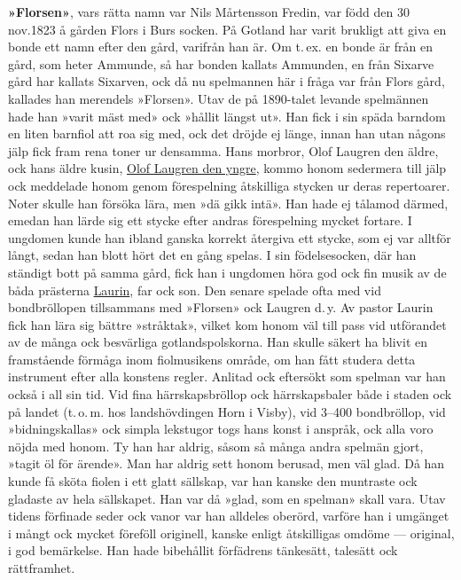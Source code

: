 \textbf{»Florsen»}, vars rätta namn var Nils Mårtensson Fredin, var född den 30 nov.\@ 1823 å gården Flors i Burs socken. På Gotland har varit brukligt att giva en bonde ett namn efter den gård, varifrån han är. Om t.\,ex. en bonde är från en gård, som heter Ammunde, så har bonden kallats Ammunden, en från Sixarve gård har kallats Sixarven, ock då nu spelmannen här i fråga var från Flors gård, kallades han merendels »Florsen». Utav de på 1890-talet levande spelmännen hade han »varit mäst med» ock »hållit längst ut». Han fick i sin späda barndom en liten barnfiol att roa sig med, ock det dröjde ej länge, innan han utan någons jälp fick fram rena toner ur densamma. Hans morbror, Olof Laugren den äldre, ock hans äldre kusin, \href{Laugren}{Olof Laugren den yngre}, kommo honom sedermera till jälp ock meddelade honom genom förespelning åtskilliga stycken ur deras repertoarer. Noter skulle han försöka lära, men »dä gikk intä». Han hade ej tålamod därmed, emedan han lärde sig ett stycke efter andras förespelning mycket fortare. I ungdomen kunde han ibland ganska korrekt återgiva ett stycke, som ej var alltför långt, sedan han blott hört det en gång spelas. I sin födelsesocken, där han ständigt bott på samma gård, fick han i ungdomen höra god ock fin musik av de båda prästerna \href{Laurin}{Laurin}, far ock son. Den senare spelade ofta med vid bondbröllopen tillsammans med »Florsen» ock Laugren d.\,y\@. Av pastor Laurin fick han lära sig bättre »stråktak», vilket kom honom väl till pass vid utförandet av de många ock besvärliga gotlandspolskorna. Han skulle säkert ha blivit en framstående förmåga inom fiolmusikens område, om han fått studera detta instrument efter alla konstens regler. Anlitad ock eftersökt som spelman var han också i all sin tid. Vid fina härrskapsbröllop ock härrskapsbaler både i staden ock på landet (t.\,o.\,m. hos landshövdingen Horn i Visby), vid 3--400 bondbröllop, vid »bidningskallas» ock simpla lekstugor togs hans konst i anspråk, ock alla voro nöjda med honom. Ty han har aldrig, såsom så många andra spelmän gjort, »tagit öl för ärende». Man har aldrig sett honom berusad, men väl glad. Då han kunde få sköta fiolen i ett glatt sällskap, var han kanske den muntraste ock gladaste av hela sällskapet. Han var då »glad, som en spelman» skall vara. Utav tidens förfinade seder ock vanor var han alldeles oberörd, varföre han i umgänget i mångt ock mycket föreföll originell, kanske enligt åtskilligas omdöme --- original, i god bemärkelse. Han hade bibehållit förfädrens tänkesätt, talesätt ock rättframhet. 

